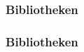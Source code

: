 \begin{frame}
\frametitle{Bibliotheken}

\begin{figure}
\end{figure}
\end{frame}

\begin{frame}
\frametitle{Bibliotheken}

\begin{figure}
\end{figure}
\end{frame}